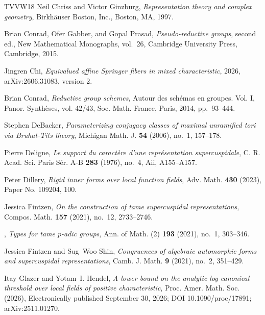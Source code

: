 \documentclass[11pt,reqno]{amsart}
\numberwithin{equation}{section}
\theoremstyle{plain}
\theoremstyle{definition}
\theoremstyle{remark}
\theoremstyle{plain}
\begin{document}
\begin{thebibliography}{TVVW18}
Neil Chriss and Victor Ginzburg, \emph{Representation theory and complex
  geometry}, Birkh\"auser Boston, Inc., Boston, MA, 1997. 

Brian Conrad, Ofer Gabber, and Gopal Prasad, \emph{Pseudo-reductive groups},
  second ed., New Mathematical Monographs, vol.~26, Cambridge University Press,
  Cambridge, 2015. 

Jingren Chi, \emph{Equivalued affine {Springer} fibers in mixed
  characteristic}, 2026, arXiv:2606.31083, version 2.

Brian Conrad, \emph{Reductive group schemes}, Autour des sch\'emas en groupes.
  {V}ol. {I}, Panor. Synth\`eses, vol. 42/43, Soc. Math. France, Paris, 2014,
  pp.~93--444. 

Stephen DeBacker, \emph{Parameterizing conjugacy classes of maximal unramified
  tori via {B}ruhat-{T}its theory}, Michigan Math. J. \textbf{54} (2006),
  no.~1, 157--178. 

Pierre Deligne, \emph{Le support du caract\`ere d'une repr\'esentation
  supercuspidale}, C. R. Acad. Sci. Paris S\'er. A-B \textbf{283} (1976),
  no.~4, Aii, A155--A157. 

Peter Dillery, \emph{Rigid inner forms over local function fields}, Adv. Math.
  \textbf{430} (2023), Paper No. 109204, 100. 

Jessica Fintzen, \emph{On the construction of tame supercuspidal
  representations}, Compos. Math. \textbf{157} (2021), no.~12, 2733--2746.

\bysame, \emph{Types for tame {$p$}-adic groups}, Ann. of Math. (2)
  \textbf{193} (2021), no.~1, 303--346. 

Jessica Fintzen and Sug~Woo Shin, \emph{Congruences of algebraic automorphic
  forms and supercuspidal representations}, Camb. J. Math. \textbf{9} (2021),
  no.~2, 351--429. 

Itay Glazer and Yotam~I. Hendel, \emph{A lower bound on the analytic
  log-canonical threshold over local fields of positive characteristic}, Proc.
  Amer. Math. Soc. (2026), Electronically published September 30, 2026; DOI
  10.1090/proc/17891; arXiv:2511.01270.


\end{thebibliography}
\end{document}
